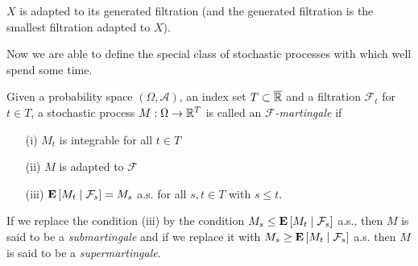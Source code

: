 \begin{examp}$X$ is adapted to its generated filtration (and the
  generated filtration is the smallest filtration adapted to $X$).
\end{examp}

Now we are able to define the special class of stochastic processes
with which well spend some time.
\begin{defn}Given a probability space $(\Omega,  \mathcal{A})$, an
  index set $T \subset \overline{\reals}$ and a
  filtration $\mathcal{F}_t$ for $t \in T$, a stochastic process $M :
  \Omega \to \reals^T$ is called an \emph{$\mathcal{F}$-martingale} if 
\begin{itemize}
\item[(i)]$M_t$ is integrable for all $t \in T$
\item[(ii)]$M$ is adapted to $\mathcal{F}$
\item[(iii)]$\cexpectationlong{\mathcal{F}_s}{M_t} = M_s$ a.s. for all
  $s,t \in T$ with $s \leq t$.
\end{itemize}
If we replace the condition (iii) by the condition
$M_s \leq \cexpectationlong{\mathcal{F}_s}{M_t}$ a.s., then $M$ is said to
be a \emph{submartingale} and if we replace it with
$M_s \geq \cexpectationlong{\mathcal{F}_s}{M_t} $ a.s. then $M$ is said to be a
\emph{supermartingale}.
\end{defn}

